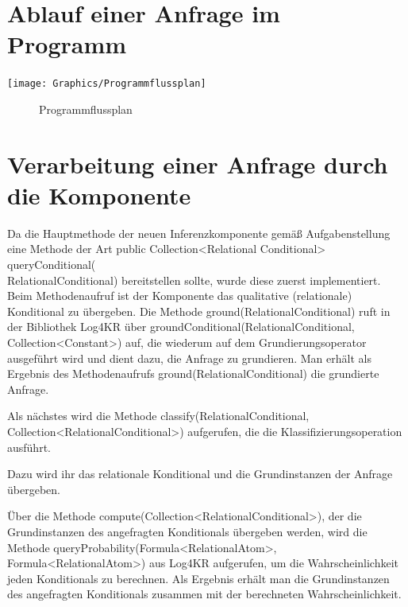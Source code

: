 \documentclass[draft]{scrreprt}
\begin{document}
{\section{Ablauf einer Anfrage im Programm}

\texttt{[image: Graphics/Programmflussplan]}
\begin{figure}[h]
		\caption{Programmflussplan}
\end{figure}


\section{Verarbeitung einer Anfrage durch die Komponente}
Da die Hauptmethode der neuen Inferenzkomponente gemäß Aufgabenstellung eine Methode der Art public Collection<Relational Conditional> queryConditional(\\RelationalConditional) bereitstellen sollte, wurde diese zuerst  implementiert. Beim Methodenaufruf ist der Komponente das qualitative (relationale) Konditional zu übergeben.
Die Methode ground(RelationalConditional) ruft in der Bibliothek Log4KR über groundConditional(RelationalConditional, Collection<Constant>) auf, die wiederum auf dem Grundierungsoperator ausgeführt wird und dient dazu, die Anfrage zu grundieren. Man erhält als Ergebnis des Methodenaufrufs ground(RelationalConditional) die grundierte Anfrage.

Als nächstes wird die Methode classify(RelationalConditional,\\ Collection<RelationalConditional>) aufgerufen, die die Klassifizierungsoperation ausführt.

Dazu wird ihr das relationale Konditional und die Grundinstanzen der Anfrage übergeben.

Über die Methode compute(Collection<RelationalConditional>), der die Grundinstanzen des angefragten Konditionals übergeben werden, wird die Methode queryProbability(Formula<RelationalAtom>, Formula<RelationalAtom>) aus Log4KR aufgerufen, um die Wahrscheinlichkeit jeden Konditionals zu berechnen. Als Ergebnis erhält man die Grundinstanzen des angefragten Konditionals zusammen mit der berechneten Wahrscheinlichkeit.

}
\end{document}
